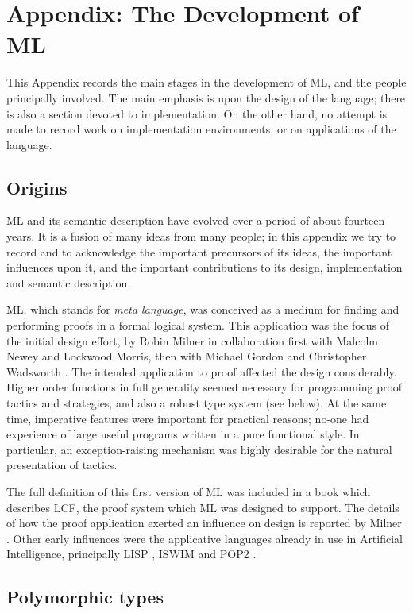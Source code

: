 \section{Appendix: The Development of ML}
\label{story-app}

This Appendix records the main stages in the development
of ML, and the people principally involved.  The main emphasis is upon
the design of the language; there is also a section devoted to 
implementation. On the other hand, no attempt is made to record work on 
implementation environments, or on applications of the language.
 
\subsection*{Origins}

ML and its semantic description have evolved over a period of about
fourteen years.  It is a fusion of many ideas from many people;  in this
appendix we try to record and to acknowledge the important precursors
of its ideas, the important influences upon it, and the important
contributions to its design, implementation and semantic description.

ML, which stands for {\sl meta language}, was conceived as a medium for
finding and performing proofs in a formal logical system.  This
application was the focus of the initial design effort, by Robin Milner
in collaboration first with Malcolm Newey and Lockwood Morris, then
with Michael Gordon and Christopher Wadsworth \cite{GMMNW}. The intended application
to proof affected the design considerably.  Higher order functions 
in full generality seemed necessary for programming proof tactics and
strategies, and also a robust type system (see below).  At the same time,
imperative features were important for practical reasons; no-one had experience
of large useful programs written in a pure functional style. In particular,
an exception-raising mechanism was highly desirable for the natural presentation
of tactics.

The full definition of this first version of ML was included in a book 
\cite{GMW}
which describes LCF, the proof system which ML was designed to support. 
The details of how the proof application exerted an influence on design is
reported by Milner \cite{Mil2}.
Other early influences were the applicative languages already in use
in Artificial Intelligence, principally LISP \cite{McC}, ISWIM \cite{Lan} and 
POP2 \cite{BP}.

\subsection*{Polymorphic types}


